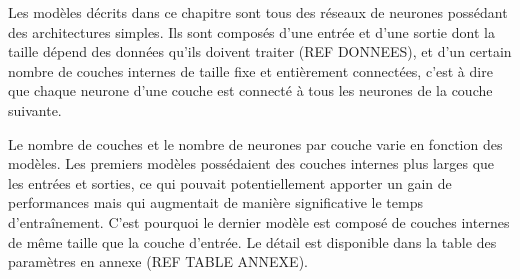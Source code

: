 \par Les modèles décrits dans ce chapitre sont tous des réseaux de neurones possédant des architectures simples. Ils sont composés d'une entrée et d'une sortie dont la taille dépend des données qu'ils doivent traiter (REF DONNEES), et d'un certain nombre de couches internes de taille fixe et entièrement connectées, c'est à dire que chaque neurone d'une couche est connecté à tous les neurones de la couche suivante.

\par Le nombre de couches et le nombre de neurones par couche varie en fonction des modèles. Les premiers modèles possédaient des couches internes plus larges que les entrées et sorties, ce qui pouvait potentiellement apporter un gain de performances mais qui augmentait de manière significative le temps d'entraînement. C'est pourquoi le dernier modèle est composé de couches internes de même taille que la couche d'entrée. Le détail est disponible dans la table des paramètres en annexe (REF TABLE ANNEXE).